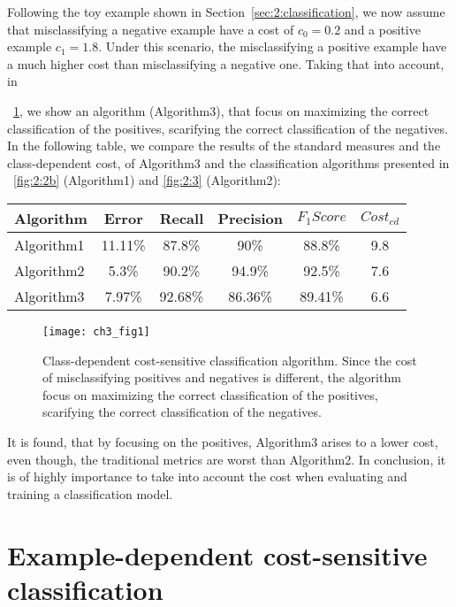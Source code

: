 Following the toy example shown in Section~\ref{sec:2:classification}, we now assume that 
misclassifying a negative example have a cost of $c_0=0.2$ and a positive example $c_1=1.8$. 
Under this scenario, the misclassifying a positive example have a much higher cost than 
misclassifying a negative one. Taking that into account, in \figurename{~\ref{fig:3:1}, we show an 
algorithm (Algorithm3), that focus on maximizing the correct classification of the positives, 
scarifying the correct classification of the negatives. In the following table, we compare the 
results of the standard measures and the class-dependent cost, of Algorithm3 and the classification 
algorithms presented in \figurename{~\ref{fig:2:2b}} (Algorithm1) and \figurename{ \ref{fig:2:3}} 
(Algorithm2):
\begin{center}
    \footnotesize
  \begin{tabular}{l|c|c|c|c|c}
  Algorithm & Error & Recall & Precision & $F_1Score$ & $Cost_{cd}$ \\
  \hline
  Algorithm1 & 11.11\% & 87.8\%& 90\%& 88.8\% & 9.8\\ %
  Algorithm2 & 5.3\% & 90.2\%& 94.9\%& 92.5\% & 7.6\\ %
  Algorithm3 & 7.97\%& 92.68\% &86.36\%& 89.41\% & 6.6 \\
  \end{tabular}
\end{center}
\vspace{0.3cm}

\begin{figure}[t!]
  \centering
  \texttt{[image: ch3\_fig1]}
  \caption{Class-dependent cost-sensitive classification algorithm. Since the cost of misclassifying 
positives and negatives is different, the algorithm focus on maximizing the correct classification 
of the positives, scarifying the correct classification of the negatives.}
  \label{fig:3:1}
\end{figure}

It is found, that by focusing on the positives, Algorithm3 arises to a lower cost, even though, the 
traditional metrics are worst than Algorithm2. In conclusion, it is of highly importance to take 
into account the cost when evaluating and training a classification model.


\section{Example-dependent cost-sensitive classification}
\label{sec:3:example-dependent}

}
